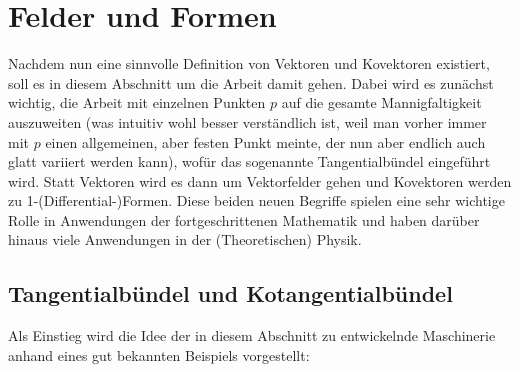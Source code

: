\documentclass[../H_Analysis_main.tex]{subfiles}
\begin{document}
\setcounter{chapter}{3}

\chapter{Felder und Formen}
\begin{center}
Nachdem nun eine sinnvolle Definition von Vektoren und Kovektoren existiert, soll es in diesem Abschnitt um die Arbeit damit gehen. Dabei wird es zunächst wichtig, die Arbeit mit einzelnen Punkten $p$ auf die gesamte Mannigfaltigkeit auszuweiten (was intuitiv wohl besser verständlich ist, weil man vorher immer mit $p$ einen allgemeinen, aber festen Punkt meinte, der nun aber endlich auch glatt variiert werden kann), wofür das sogenannte Tangentialbündel eingeführt wird. Statt Vektoren wird es dann um Vektorfelder gehen und Kovektoren werden zu 1-(Differential-)Formen. Diese beiden neuen Begriffe spielen eine sehr wichtige Rolle in Anwendungen der fortgeschrittenen Mathematik und haben darüber hinaus viele Anwendungen in der (Theoretischen) Physik.
\end{center}


\newpage


	\section{Tangentialbündel und Kotangentialbündel}
Als Einstieg wird die Idee der in diesem Abschnitt zu entwickelnde Maschinerie anhand eines gut bekannten Beispiels vorgestellt:
\end{document}
